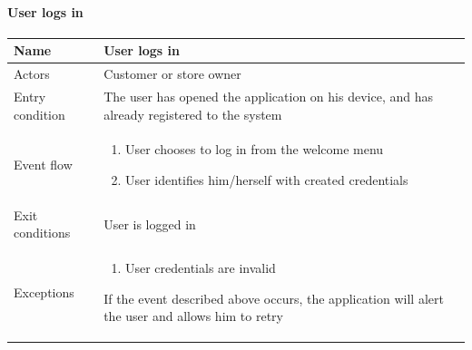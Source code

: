 \paragraph{User logs in}
\begin{flushleft}
	\begin{tabular} { | m{3cm} | m{10cm} | }
		\hline
		Name & User logs in\\
		\hline
		Actors & Customer or store owner\\
		\hline
		Entry condition & The user has opened the application on his device, and has already registered to the system\\
		\hline
		Event flow & \begin{enumerate}
            \item User chooses to log in from the welcome menu
            \item User identifies him/herself with created credentials
		\end{enumerate}\\
		\hline
		Exit conditions & User is logged in\\
		\hline
		Exceptions & \begin{enumerate}
			\item User credentials are invalid
		\end{enumerate}
		If the event described above occurs, the application will alert the user and allows him to retry\\
		\hline
	\end{tabular}
\end{flushleft}

